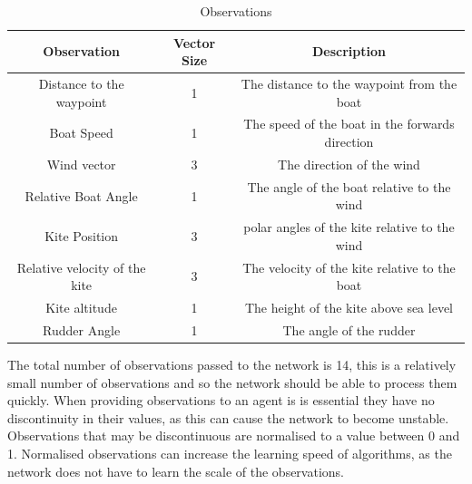 \begin{table}[h]
    \centering
    \begin{tabular}{c|c|c}
        Observation & Vector Size & Description \\
        \midrule
        Distance to the waypoint & 1 & The distance to the waypoint from the boat \\
        Boat Speed & 1 & The speed of the boat in the forwards direction \\
        Wind vector & 3 & The direction of the wind \\
        Relative Boat Angle & 1 & The angle of the boat relative to the wind \\
        Kite Position & 3 & polar angles of the kite relative to the wind\\
        Relative velocity of the kite & 3 & The velocity of the kite relative to the boat \\
        Kite altitude & 1 & The height of the kite above sea level \\
        Rudder Angle & 1 & The angle of the rudder \\

        \hline
    \end{tabular}
    \caption{Observations}\label{observations}
\end{table}

The total number of observations passed to the network is 14, this is a relatively small number of observations and so the network should be able to process them quickly. When providing observations to an agent is is essential they have no discontinuity in their values, as this can cause the network to become unstable. Observations that may be discontinuous are normalised to a value between 0 and 1. Normalised observations can increase the learning speed of algorithms, as the network does not have to learn the scale of the observations.

